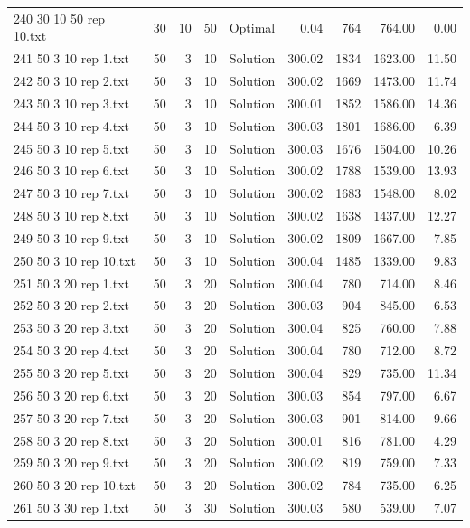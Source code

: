 \begin{longtable}{lrrllrrrr}
240 30 10 50 rep 10.txt & 30 & 10 & 50 & Optimal &  0.04 & 764 & 764.00 &  0.00\\
241 50 3 10 rep 1.txt & 50 & 3 & 10 & Solution & 300.02 & 1834 & 1623.00 & 11.50\\
242 50 3 10 rep 2.txt & 50 & 3 & 10 & Solution & 300.02 & 1669 & 1473.00 & 11.74\\
243 50 3 10 rep 3.txt & 50 & 3 & 10 & Solution & 300.01 & 1852 & 1586.00 & 14.36\\
244 50 3 10 rep 4.txt & 50 & 3 & 10 & Solution & 300.03 & 1801 & 1686.00 &  6.39\\
245 50 3 10 rep 5.txt & 50 & 3 & 10 & Solution & 300.03 & 1676 & 1504.00 & 10.26\\
246 50 3 10 rep 6.txt & 50 & 3 & 10 & Solution & 300.02 & 1788 & 1539.00 & 13.93\\
247 50 3 10 rep 7.txt & 50 & 3 & 10 & Solution & 300.02 & 1683 & 1548.00 &  8.02\\
248 50 3 10 rep 8.txt & 50 & 3 & 10 & Solution & 300.02 & 1638 & 1437.00 & 12.27\\
249 50 3 10 rep 9.txt & 50 & 3 & 10 & Solution & 300.02 & 1809 & 1667.00 &  7.85\\
250 50 3 10 rep 10.txt & 50 & 3 & 10 & Solution & 300.04 & 1485 & 1339.00 &  9.83\\
251 50 3 20 rep 1.txt & 50 & 3 & 20 & Solution & 300.04 & 780 & 714.00 &  8.46\\
252 50 3 20 rep 2.txt & 50 & 3 & 20 & Solution & 300.03 & 904 & 845.00 &  6.53\\
253 50 3 20 rep 3.txt & 50 & 3 & 20 & Solution & 300.04 & 825 & 760.00 &  7.88\\
254 50 3 20 rep 4.txt & 50 & 3 & 20 & Solution & 300.04 & 780 & 712.00 &  8.72\\
255 50 3 20 rep 5.txt & 50 & 3 & 20 & Solution & 300.04 & 829 & 735.00 & 11.34\\
256 50 3 20 rep 6.txt & 50 & 3 & 20 & Solution & 300.03 & 854 & 797.00 &  6.67\\
257 50 3 20 rep 7.txt & 50 & 3 & 20 & Solution & 300.03 & 901 & 814.00 &  9.66\\
258 50 3 20 rep 8.txt & 50 & 3 & 20 & Solution & 300.01 & 816 & 781.00 &  4.29\\
259 50 3 20 rep 9.txt & 50 & 3 & 20 & Solution & 300.02 & 819 & 759.00 &  7.33\\
260 50 3 20 rep 10.txt & 50 & 3 & 20 & Solution & 300.02 & 784 & 735.00 &  6.25\\
261 50 3 30 rep 1.txt & 50 & 3 & 30 & Solution & 300.03 & 580 & 539.00 &  7.07\\

\end{longtable}
